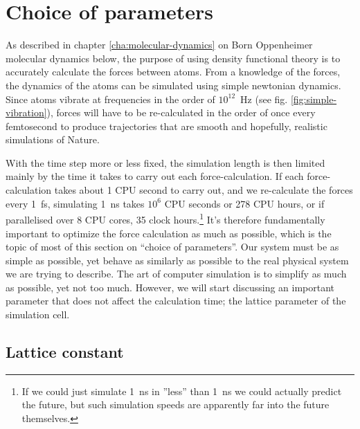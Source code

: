 \documentclass[11pt,bibliography=totoc,index=totoc]{scrbook}   %
\newcommand{\comment}[1]{\hl{#1}}
\begin{document}



%
\section{Choice of parameters}\label{sec:parameters}
%

As described in chapter \ref{cha:molecular-dynamics} on Born Oppenheimer molecular dynamics below, the purpose of using density functional theory is to accurately calculate the forces between atoms. 
From a knowledge of the forces, the dynamics of the atoms can be simulated using simple newtonian dynamics.
Since atoms vibrate at frequencies in the order of $10^{12}$~Hz (see fig. \ref{fig:simple-vibration}), 
forces will have to be re-calculated in the order of once every femtosecond to produce trajectories that are smooth and hopefully, realistic simulations of Nature.

With the time step more or less fixed, the simulation length is then limited mainly by the time it takes to carry out each force-calculation.
If each force-calculation takes about 1 CPU second to carry out, and we re-calculate the forces every 1~fs, simulating 1~ns takes $10^6$ CPU seconds or 278 CPU hours, or if parallelised over 8 CPU cores, 35 clock hours.\footnote{If we could just simulate 1~ns in ''less'' than 1~ns we could actually predict the future, but such simulation speeds are apparently far into the future themselves.}
It's therefore fundamentally important to optimize the force calculation as much as possible, which is the topic of most of this section on ``choice of parameters''.
Our system must be as simple as possible, yet behave as similarly as possible to the real physical system we are trying to describe. 
The art of computer simulation is to simplify as much as possible, yet not too much.
However, we will start discussing an important parameter that does not affect the calculation time; the lattice parameter of the simulation cell.

%
\subsection{Lattice constant}\label{sec:parameters:a}
%
\end{document}
